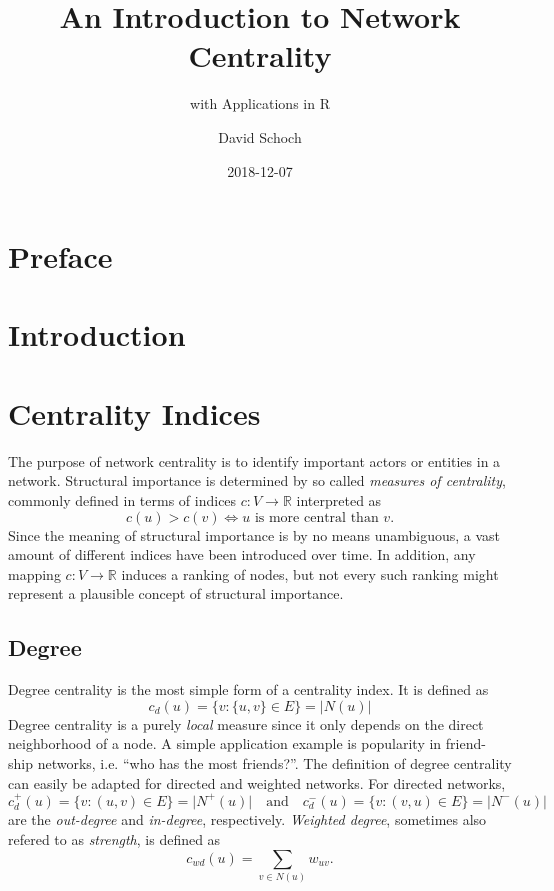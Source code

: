 \documentclass[]{book}
\title{An Introduction to Network Centrality}
\subtitle{with Applications in R}
\author{David Schoch}
\date{2018-12-07}
\theoremstyle{definition}
\theoremstyle{definition}
\theoremstyle{definition}
\theoremstyle{remark}
\begin{document}
\maketitle

{
\setcounter{tocdepth}{1}
\tableofcontents
}
\hypertarget{preface}{%
\chapter*{Preface}\label{preface}}

\hypertarget{intro}{%
\chapter{Introduction}\label{intro}}

\hypertarget{indices}{%
\chapter{Centrality Indices}\label{indices}}

The purpose of network centrality is to identify important actors or
entities in a network. Structural importance is determined by so called
\emph{measures of centrality}, commonly defined in terms of indices
\(c: V \to \mathbb{R}\) interpreted as \[
c(u) > c(v) \iff u \text{ is more central than } v.
\] Since the meaning of structural importance is by no means
unambiguous, a vast amount of different indices have been introduced
over time. In addition, any mapping \(c: V \to \mathbb{R}\) induces a
ranking of nodes, but not every such ranking might represent a plausible
concept of structural importance.

\hypertarget{degree}{%
\section{Degree}\label{degree}}

Degree centrality is the most simple form of a centrality index. It is
defined as \[
c_d(u) = \{v : \{u,v\} \in E\} = \lvert N(u) \rvert
\] Degree centrality is a purely \emph{local} measure since it only
depends on the direct neighborhood of a node. A simple application
example is popularity in friend- ship networks, i.e. ``who has the most
friends?''. The definition of degree centrality can easily be adapted
for directed and weighted networks. For directed networks, \[
c_d^+(u)=\{v : (u,v) \in E\} = \lvert N^+(u) \rvert \quad \text{and} \quad 
c_d^-(u)=\{v : (v,u) \in E\} = \lvert N^-(u) \rvert
\] are the \emph{out-degree} and \emph{in-degree}, respectively.
\emph{Weighted degree}, sometimes also refered to as \emph{strength}, is
defined as \[
c_{wd}(u)=\sum_{v \in N(u)} w_{uv}.
\]
\end{document}
